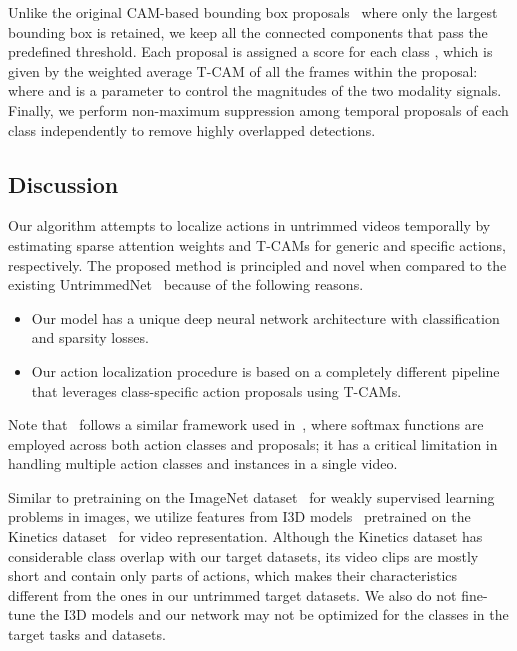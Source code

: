 \documentclass[10pt,twocolumn,letterpaper]{article}
\begin{document}
Unlike the original CAM-based bounding box proposals~\cite{zhou16learning} where only the largest bounding box is retained, we keep all the connected components that pass the predefined threshold. 
Each proposal  is assigned a score for each class , which is given by the weighted average T-CAM of all the frames within the proposal:
where  and  is a parameter to control the magnitudes of the two modality signals.
Finally, we perform non-maximum suppression among temporal proposals of each class independently to remove highly overlapped detections.
































\subsection{Discussion}
\label{sub:discussion}

Our algorithm attempts to localize actions in untrimmed videos temporally by estimating sparse attention weights and T-CAMs for generic and specific actions, respectively.
The proposed method is principled and novel when compared to the existing UntrimmedNet~\cite{wang17untrimmednets} because of the following reasons.
\begin{itemize}
\item Our model has a unique deep neural network architecture with classification and sparsity losses.
\item Our action localization procedure is based on a completely different pipeline that leverages class-specific action proposals using T-CAMs.
\end{itemize}
Note that~\cite{wang17untrimmednets} follows a similar framework used in~\cite{bilen16weakly}, where softmax functions are employed across both action classes and proposals; it has a critical limitation in handling multiple action classes and instances in a single video.




Similar to pretraining on the ImageNet dataset~\cite{deng09imagenet} for weakly supervised learning problems in images, we utilize features from I3D models~\cite{carreira17quo} pretrained on the Kinetics dataset~\cite{kay2017kinetics} for video representation. 
Although the Kinetics dataset has considerable class overlap with our target datasets, its video clips are mostly short and contain only parts of actions, which makes their characteristics different from the ones in our untrimmed target datasets. 
We also do not fine-tune the I3D models and our network may not be optimized for the classes in the target tasks and datasets.
 
\end{document}
